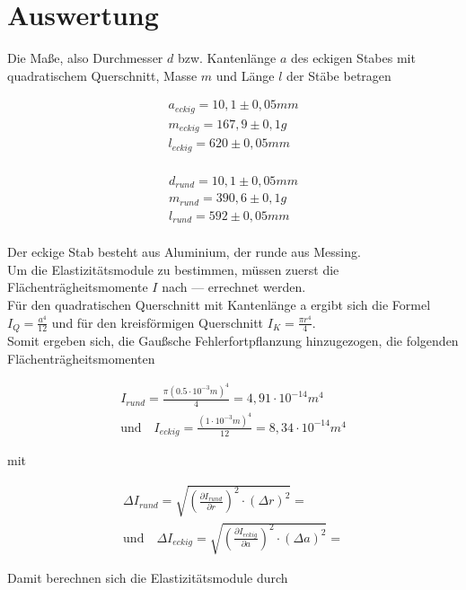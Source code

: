 \section{Auswertung}
\label{sec:Auswertung}

Die Maße, also Durchmesser $d$ bzw. Kantenlänge $a$ des eckigen Stabes mit quadratischem Querschnitt, Masse $m$ und Länge $l$ der Stäbe betragen

\begin{align*}
  a_{eckig} = 10,1 \pm 0,05mm \\
  m_{eckig} = 167,9 \pm 0,1g \\
  l_{eckig} = 620 \pm 0,05mm\\
\end{align*}

\begin{align*}
  d_{rund} = 10,1 \pm 0,05mm \\
  m_{rund} = 390,6 \pm 0,1g \\
  l_{rund} = 592 \pm 0,05mm \\
\end{align*}

Der eckige Stab besteht aus Aluminium, der runde aus Messing.\\
Um die Elastizitätsmodule zu bestimmen, müssen zuerst die Flächenträgheitsmomente $I$ nach --- errechnet werden.\\
Für den quadratischen Querschnitt mit Kantenlänge a ergibt sich die Formel $I_Q = \frac{a^4}{12}$ und 
für den kreisförmigen Querschnitt
$I_K = \frac{\pi r^4}{4}$. \\
Somit ergeben sich, die Gaußsche Fehlerfortpflanzung hinzugezogen, die folgenden Flächenträgheitsmomenten

\begin{align*}
  I_{rund} = \frac{\pi (0.5\cdot 10^{-3}m)^4}{4} = 4,91 \cdot 10^{-14}m^4 \quad \\
  \textrm{und} \quad I_{eckig} = \frac{(1 \cdot 10^{-3}m)^4}{12} = 8,34 \cdot 10^{-14}m^4
\end{align*}

mit 

\begin{align*}
  \varDelta I_{rund} =  \sqrt{ (\frac{\partial I_{rund}}{\partial r})^2 \cdot (\varDelta r)^2} =  \\
  \textrm{und} \quad \varDelta I_{eckig} = \sqrt{ (\frac{\partial I_{eckig}}{\partial a})^2 \cdot (\varDelta a)^2} = 
\end{align*}

Damit berechnen sich die Elastizitätsmodule durch 

